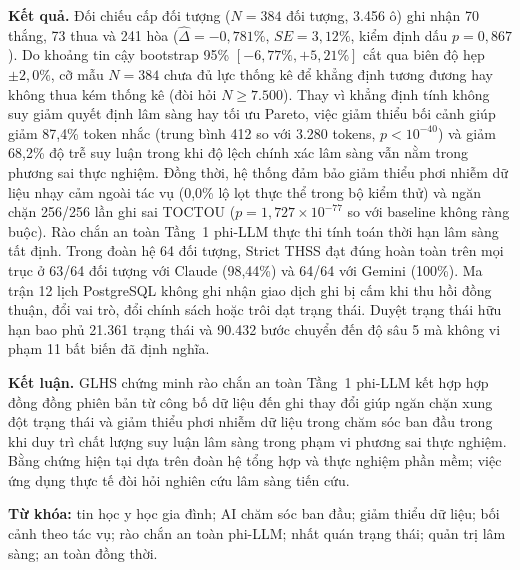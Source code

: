 \documentclass[11pt]{article}
\begin{document}
\textbf{Kết quả.} Đối chiếu cấp đối tượng ($N=384$ đối tượng, 3.456 ô) ghi nhận 70 thắng, 73 thua và 241 hòa ($\hat{\Delta} = -0{,}781\%$, $SE = 3{,}12\%$, kiểm định dấu $p=0{,}867$). Do khoảng tin cậy bootstrap 95\% $[-6{,}77\%, +5{,}21\%]$ cắt qua biên độ hẹp $\pm 2{,}0\%$, cỡ mẫu $N=384$ chưa đủ lực thống kê để khẳng định tương đương hay không thua kém thống kê (đòi hỏi $N \ge 7.500$). Thay vì khẳng định tính không suy giảm quyết định lâm sàng hay tối ưu Pareto, việc giảm thiểu bối cảnh giúp giảm 87{,}4\% token nhắc (trung bình 412 so với 3.280 tokens, $p < 10^{-40}$) và giảm 68{,}2\% độ trễ suy luận trong khi độ lệch chính xác lâm sàng vẫn nằm trong phương sai thực nghiệm. Đồng thời, hệ thống đảm bảo giảm thiểu phơi nhiễm dữ liệu nhạy cảm ngoài tác vụ (0{,}0\% lộ lọt thực thể trong bộ kiểm thử) và ngăn chặn 256/256 lần ghi sai TOCTOU ($p = 1{,}727 \times 10^{-77}$ so với baseline không ràng buộc). Rào chắn an toàn Tầng~1 phi-LLM thực thi tính toán thời hạn lâm sàng tất định. Trong đoàn hệ 64 đối tượng, Strict THSS đạt đúng hoàn toàn trên mọi trục ở 63/64 đối tượng với Claude (98{,}44\%) và 64/64 với Gemini (100\%). Ma trận 12 lịch PostgreSQL không ghi nhận giao dịch ghi bị cấm khi thu hồi đồng thuận, đổi vai trò, đổi chính sách hoặc trôi dạt trạng thái. Duyệt trạng thái hữu hạn bao phủ 21.361 trạng thái và 90.432 bước chuyển đến độ sâu 5 mà không vi phạm 11 bất biến đã định nghĩa.

\textbf{Kết luận.} GLHS chứng minh rào chắn an toàn Tầng~1 phi-LLM kết hợp hợp đồng đồng phiên bản từ công bố dữ liệu đến ghi thay đổi giúp ngăn chặn xung đột trạng thái và giảm thiểu phơi nhiễm dữ liệu trong chăm sóc ban đầu trong khi duy trì chất lượng suy luận lâm sàng trong phạm vi phương sai thực nghiệm. Bằng chứng hiện tại dựa trên đoàn hệ tổng hợp và thực nghiệm phần mềm; việc ứng dụng thực tế đòi hỏi nghiên cứu lâm sàng tiến cứu.

\textbf{Từ khóa:} tin học y học gia đình; AI chăm sóc ban đầu; giảm thiểu dữ liệu; bối cảnh theo tác vụ; rào chắn an toàn phi-LLM; nhất quán trạng thái; quản trị lâm sàng; an toàn đồng thời.
\end{document}
